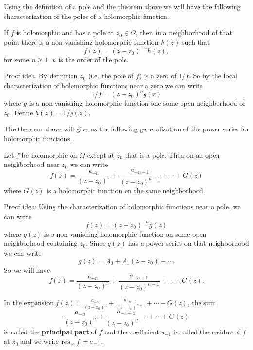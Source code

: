 Using the definition of a pole and the theorem above we will have the following characterization of the poles of a holomorphic function.

\begin{theorem}
	If $ f $ is holomorphic and has a pole at $ z_0 \in \Omega $, then in a neighborhood of that point there is a non-vanishing holomorphic function $ h(z) $ such that 
	\[ f(z) = (z-z_0)^{-n} h(z), \]
	for some $ n \geq 1 $. $ n $ is the order of the pole.
\end{theorem}
\begin{remark}
	Proof idea. By definition $ z_0 $ (i.e. the pole of $ f $) is a zero of $ 1/f $. So by the local characterization of holomorphic functions near a zero we can write
	\[ 1/f = (z-z_0)^{n}g(z) \]
	where $ g $ is a non-vanishing holomorphic function one some open neighborhood of $ z_0 $. Define $ h(z)=1/g(z) $.
\end{remark}

The theorem above will give us the following generalization of the power series for holomorphic functions.

\begin{proposition}
	Let $ f $ be holomorphic on $ \Omega $ except at $ z_0 $ that is a pole. Then on an open neighborhood near $ z_0 $ we can write
	\[ f(z) = \frac{a_{-n}}{(z-z_0)^n} + \frac{a_{-n+1}}{(z-z_0)^{n-1}} + \cdots + G(z) \]
	where $ G(z) $ is a holomorphic function on the same neighborhood.
\end{proposition}
\begin{remark}
	Proof idea: Using the characterization of holomorphic functions near a pole, we can write
	\[ f(z) = (z-z_0)^{-n} g(z) \]
	where $ g(z) $ is a non-vanishing holomorphic function on some open neighborhood containing $ z_0 $. Since $ g(z) $ has a power series on that neighborhood we can write
	\[ g(z) = A_0 + A_1(z-z_0) + \cdots. \]
	So we will have
	\[ f(z) = \frac{a_{-n}}{(z-z_0)^n} + \frac{a_{-n+1}}{(z-z_0)^{n-1}} + \cdots + G(z). \]
\end{remark}
\begin{summary}
	In the expansion $ f(z) = \frac{a_{-n}}{(z-z_0)^n} + \frac{a_{-n+1}}{(z-z_0)^{n-1}} + \cdots + G(z) $, the sum
	\[ \frac{a_{-n}}{(z-z_0)^n} + \frac{a_{-n+1}}{(z-z_0)^{n-1}} + \cdots + G(z) \]
	is called the \textbf{principal part} of $ f $ and the coefficient $ a_{-1} $ is called the residue of $ f $ at $ z_0 $ and we write $ \operatorname{res}_{z_0}f = a_{-1} $.
\end{summary}

